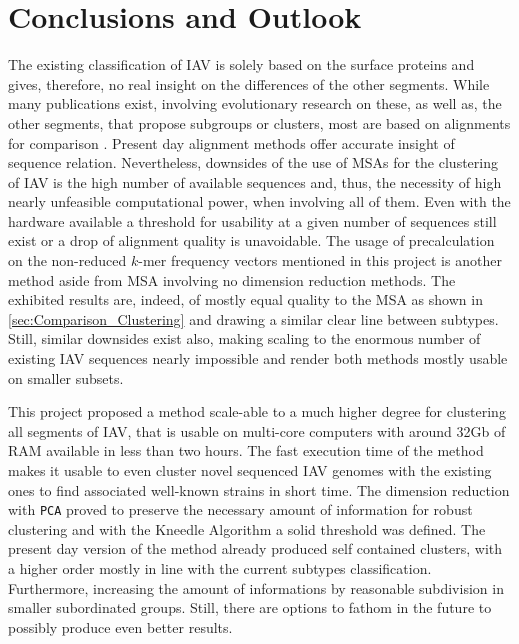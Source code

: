 \chapter{Conclusions and Outlook} \label{chap:Conclusion}

The existing classification of \gls{IAV} is solely based on the surface proteins and gives, therefore, no real insight on the differences of the other segments. While many publications exist, involving evolutionary research on these, as well as, the other segments, that propose subgroups or clusters, most are based on alignments for comparison \autocite{suarez_evolution_2000, nelson_multiple_2008, whooiefao_h5n1_evolution_working_group_continued_2012}. Present day alignment methods offer accurate insight of sequence relation. Nevertheless, downsides of the use of \glspl{MSA} for the clustering of \gls{IAV} is the high number of available sequences and, thus, the necessity of high nearly unfeasible computational power, when involving all of them. Even with the hardware available a threshold for usability at a given number of sequences still exist or a drop of alignment quality is unavoidable. The usage of precalculation on the non-reduced $k$-mer frequency vectors mentioned in this project is another method aside from \gls{MSA} involving no dimension reduction methods. The exhibited results are, indeed, of mostly equal quality to the \gls{MSA} as shown in \autoref{sec:Comparison_Clustering} and drawing a similar clear line between subtypes. Still, similar downsides exist also, making scaling to the enormous number of existing \gls{IAV} sequences nearly impossible and render both methods mostly usable on smaller subsets.

\vspace{1em}

This project proposed a method scale-able to a much higher degree for clustering all segments of \gls{IAV}, that is usable on multi-core computers with around 32Gb of RAM available in less than two hours. The fast execution time of the method makes it usable to even cluster novel sequenced \gls{IAV} genomes with the existing ones to find associated well-known strains in short time. The dimension reduction with \texttt{PCA} proved to preserve the necessary amount of information for robust clustering and with the Kneedle Algorithm a solid threshold was defined. The present day version of the method already produced self contained clusters, with a higher order mostly in line with the current subtypes classification. Furthermore, increasing the amount of informations by reasonable subdivision in smaller subordinated groups. Still, there are options to fathom in the future to possibly produce even better results. 

